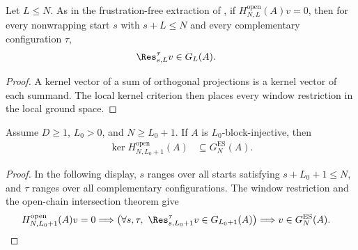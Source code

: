 \begin{lemma}
    \label{thm:open_parent_hamiltonian_window_ground_space}
    \leanok
    Let $L\le N$. As in the frustration-free extraction of
    \cite[Equation~(3.12)]{Nachtergaele1996Spectral}, if
    $H^{\mathrm{open}}_{N,L}(A)v=0$, then for every nonwrapping start $s$
    with $s+L\le N$ and every complementary configuration $\tau$,
    \begin{align}
        \Res^\tau_{s,L}v & \in G_L(A).
        \notag
    \end{align}
\end{lemma}

\begin{proof}
    \leanok
    A kernel vector of a sum of orthogonal projections is a kernel vector of
    each summand. The local kernel criterion then places every window
    restriction in the local ground space.
\end{proof}

\begin{lemma}
    \label{thm:open_hamiltonian_kernel_le_ground_space}
    \leanok
    Assume $D\geq1$, $L_0>0$, and $N\geq L_0+1$. If $A$ is
    $L_0$-block-injective, then
    \begin{align}
        \ker H^{\mathrm{open}}_{N,L_0+1}(A)
         & \subseteq G_N^{\mathrm{ES}}(A).
    \end{align}
\end{lemma}

\begin{proof}
    \leanok
    In the following display, $s$ ranges over all starts satisfying
    $s+L_0+1\leq N$, and $\tau$ ranges over all complementary configurations.
    The window restriction and the open-chain intersection theorem give
    \begin{align}
        H^{\mathrm{open}}_{N,L_0+1}(A)v=0
         & \Longrightarrow
        \bigl(\forall s,\tau,\
        \Res^\tau_{s,L_0+1}v\in G_{L_0+1}(A)\bigr)
        \Longrightarrow v\in G_N^{\mathrm{ES}}(A).
    \end{align}
\end{proof}

